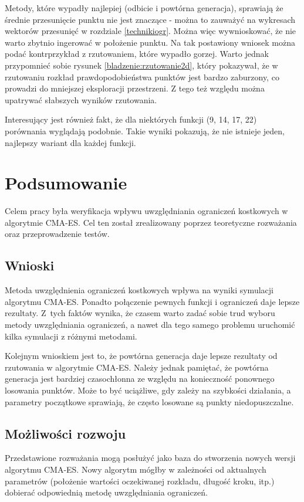 \documentclass{mini}
\begin{document}
Metody, które wypadły najlepiej (odbicie i powtórna generacja), sprawiają że średnie przesunięcie punktu nie jest znaczące - można to zauważyć na wykresach wektorów przesunięć w rozdziale \ref{technikiogr}. Można więc wywnioskować, że nie warto zbytnio ingerować w położenie punktu. Na tak postawiony wniosek można podać kontrprzykład z rzutowaniem, które wypadło gorzej. Warto jednak przypomnieć sobie rysunek \ref{bladzenie:rzutowanie2d}, który pokazywał, że w rzutowaniu rozkład prawdopodobieństwa punktów jest bardzo zaburzony, co prowadzi do mniejszej eksploracji przestrzeni. Z tego też względu można upatrywać słabszych wyników rzutowania.

Interesujący jest również fakt, że dla niektórych funkcji (9, 14, 17, 22) porównania wyglądają podobnie. Takie wyniki pokazują, że nie istnieje jeden, najlepszy wariant dla każdej funkcji.


\pagebreak

\section{Podsumowanie}
\hspace{3,4ex}Celem pracy była weryfikacja wpływu uwzględniania ograniczeń kostkowych w algorytmie CMA-ES. Cel ten został zrealizowany poprzez teoretyczne rozważania oraz przeprowadzenie testów.

\subsection{Wnioski}
\hspace{3,4ex}Metoda uwzględnienia ograniczeń kostkowych wpływa na wyniki symulacji algorytmu CMA-ES. Ponadto połączenie pewnych funkcji i ograniczeń daje lepsze rezultaty. Z~tych faktów wynika, że czasem warto zadać sobie trud wyboru metody uwzględniania ograniczeń, a nawet dla tego samego problemu uruchomić kilka symulacji z różnymi metodami.

Kolejnym wnioskiem jest to, że powtórna generacja daje lepsze rezultaty od rzutowania w algorytmie CMA-ES. Należy jednak pamiętać, że powtórna generacja jest bardziej czasochłonna ze względu na konieczność ponownego losowania punktów. Może to być uciążliwe, gdy zależy na szybkości działania, a parametry początkowe sprawiają, że często losowane są punkty niedopuszczalne.

\subsection{Możliwości rozwoju}
\hspace{3,4ex}Przedstawione rozważania mogą posłużyć jako baza do stworzenia nowych wersji algorytmu CMA-ES. Nowy algorytm mógłby w zależności od aktualnych parametrów (położenie wartości oczekiwanej rozkładu, długość kroku, itp.) dobierać odpowiednią metodę uwzględniania ograniczeń.
\end{document}
